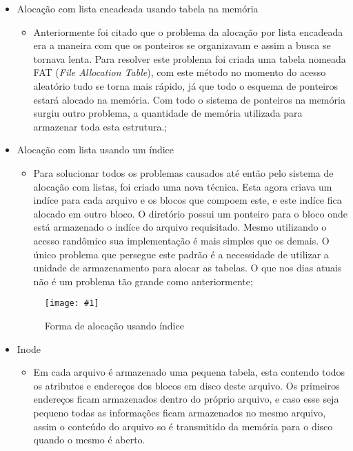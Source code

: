 \documentclass[
	12pt,				%
	openright,			%
	twoside,			%
	a4paper,			%
	chapter=TITLE,		%
	section=TITLE,		%
	english,	
	brazil				%
]{abntex2}
\newcommand{\imagem}[3]{
	\begin{figure}[htb]
		\begin{center}
			\texttt{[image: \#1]}
		\end{center}
		\caption{#2}%
	\end{figure}	
}
\begin{document}
\begin{itemize}
\imagem{alocEncad.jpg}{Forma de alocação por lista encadeada}{rótulo_para_referência}

\item Alocação com lista encadeada usando tabela na memória

	\begin{itemize}
		\item Anteriormente foi citado que o problema da alocação por lista encadeada era a maneira com que os ponteiros se organizavam e assim a busca se tornava lenta. Para resolver este problema foi criada uma tabela nomeada FAT (\textit{File Allocation Table}), com este método no momento do acesso aleatório tudo se torna mais rápido, já que todo o esquema de ponteiros estará alocado na memória. Com todo o sistema de ponteiros na memória surgiu outro problema, a quantidade de memória utilizada para armazenar toda esta estrutura.;
	\end{itemize}

\item Alocação com lista usando um índice

	\begin{itemize}
		\item Para solucionar todos os problemas causados até então pelo sistema de alocação com listas, foi criado uma nova técnica. Esta agora criava um indíce para cada arquivo e os blocos que compoem este, e este indíce fica alocado em outro bloco. O diretório possui um ponteiro para o bloco onde está armazenado o indíce do arquivo requisitado. Mesmo utilizando o acesso randômico sua implementação é mais simples que os demais. O único problema que persegue este padrão é a necessidade de utilizar a unidade de armazenamento para alocar as tabelas. O que nos dias atuais não é um problema tão grande como anteriormente;

	\end{itemize}
\imagem{alocIndice.jpg}{Forma de alocação usando índice}{rótulo_para_referência}

\item Inode

	\begin{itemize}
		\item Em cada arquivo é armazenado uma pequena tabela, esta contendo todos os atributos e endereços dos blocos em disco deste arquivo. Os primeiros endereços ficam armazenados dentro do próprio arquivo, e caso esse seja pequeno todas as informações ficam armazenados no mesmo arquivo, assim o conteúdo do arquivo so é transmitido da memória para o disco quando o mesmo é aberto.
	\end{itemize}



\end{itemize}
\end{document}
